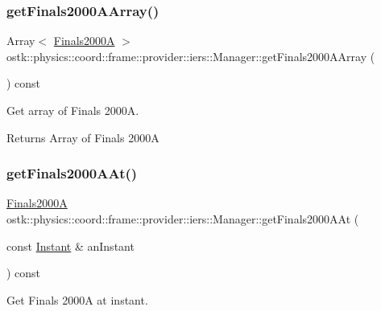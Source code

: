 \subsubsection{\texorpdfstring{get\+Finals2000\+A\+Array()}{getFinals2000AArray()}}
{\footnotesize\ttfamily Array$<$ \hyperlink{classostk_1_1physics_1_1coord_1_1frame_1_1provider_1_1iers_1_1_finals2000_a}{Finals2000A} $>$ ostk\+::physics\+::coord\+::frame\+::provider\+::iers\+::\+Manager\+::get\+Finals2000\+A\+Array (\begin{DoxyParamCaption}{ }\end{DoxyParamCaption}) const}



Get array of Finals 2000A. 

\begin{DoxyReturn}{Returns}
Array of Finals 2000A 
\end{DoxyReturn}
\mbox{\label{classostk_1_1physics_1_1coord_1_1frame_1_1provider_1_1iers_1_1_manager_a57081be2537ed82f94729c5954d2c28d}} 
\subsubsection{\texorpdfstring{get\+Finals2000\+A\+At()}{getFinals2000AAt()}}
{\footnotesize\ttfamily \hyperlink{classostk_1_1physics_1_1coord_1_1frame_1_1provider_1_1iers_1_1_finals2000_a}{Finals2000A} ostk\+::physics\+::coord\+::frame\+::provider\+::iers\+::\+Manager\+::get\+Finals2000\+A\+At (\begin{DoxyParamCaption}\item[{const \hyperlink{classostk_1_1physics_1_1time_1_1_instant}{Instant} \&}]{an\+Instant }\end{DoxyParamCaption}) const}



Get Finals 2000A at instant. 


